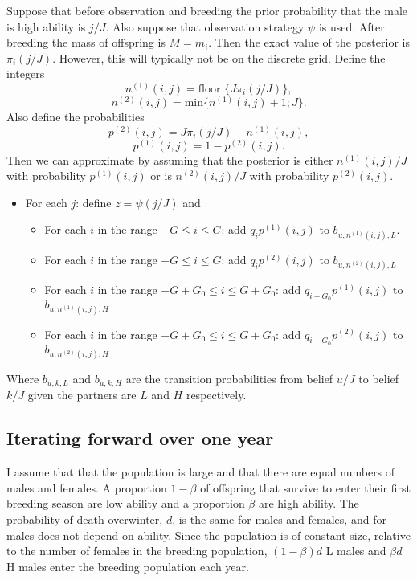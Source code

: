 \documentclass[10pt]{article}
\begin{document}
Suppose that before observation and breeding the prior probability
that the male is high ability is $j/J$. Also suppose that observation
strategy $\psi$ is used. After breeding the mass of offspring is
$M=m_{i}$. Then the exact value of the posterior is $\pi{}_{i}(j/J)$.
However, this will typically not be on the discrete grid. Define the
integers 
\[
n^{(1)}(i,j)=\text{floor }\{J\pi{}_{i}(j/J)\},
\]
\[
n^{(2)}(i,j)=\text{min}\{n^{(1)}(i,j)+1;J\}.
\]
Also define the probabilities
\[
p^{(2)}(i,j)=J\pi{}_{i}(j/J)-n^{(1)}(i,j),
\]
\[
p^{(1)}(i,j)=1-p^{(2)}(i,j).
\]
Then we can approximate by assuming that the posterior is either $n^{(1)}(i,j)/J$
with probability $p^{(1)}(i,j)$ or is $n^{(2)}(i,j)/J$ with probability
$p^{(2)}(i,j)$. 
\begin{itemize}
	\item For each $j$: define $z=\psi(j/J)$ and
	\begin{itemize}
		\item For each $i$ in the range $-G\leq i\leq G$: add $q_{i}p^{(1)}(i,j)$
		to $b_{u,n^{(1)}(i,j),L}$. 
		\item For each $i$ in the range $-G\leq i\leq G$: add $q_{i}p^{(2)}(i,j)$
		to $b_{u,n^{(2)}(i,j),L}$
		\item For each $i$ in the range $-G+G_{0}\leq i\leq G+G_{0}$: add $q_{i-G_{0}}p^{(1)}(i,j)$
		to $b_{u,n^{(1)}(i,j),H}$ 
		\item For each $i$ in the range $-G+G_{0}\leq i\leq G+G_{0}$: add $q_{i-G_{0}}p^{(2)}(i,j)$
		to $b_{u,n^{(2)}(i,j),H}$
	\end{itemize}
\end{itemize}
Where $b_{u,k,L}$ and $b_{u,k,H}$ are the transition probabilities
from belief $u/J$ to belief $k/J$ given the partners are $L$ and
$H$ respectively.

\subsection{Iterating forward over one year }

I assume that that the population is large and that there are equal
numbers of males and females. A proportion $1-\beta$ of offspring
that survive to enter their first breeding season are low ability
and a proportion $\beta$ are high ability. The probability of death
overwinter, $d$, is the same for males and females, and for males
does not depend on ability. Since the population is of constant size,
relative to the number of females in the breeding population, $(1-\beta)d$
L males and $\beta d$ H males enter the breeding population each
year. 
\end{document}
